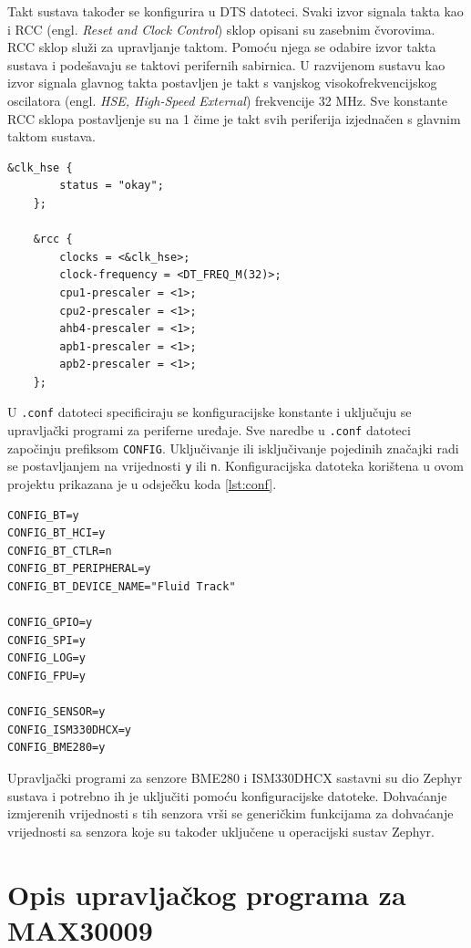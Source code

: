 \documentclass[../diplomski_rad.tex]{subfiles}
\begin{document}
Takt sustava također se konfigurira u DTS datoteci. Svaki izvor signala takta kao i 
RCC (engl. \textit{Reset and Clock Control}) sklop opisani su zasebnim čvorovima. 
RCC sklop služi za upravljanje taktom. Pomoću njega se odabire izvor takta sustava i podešavaju se 
taktovi perifernih sabirnica. 
U razvijenom sustavu kao izvor signala glavnog takta postavljen je takt s vanjskog visokofrekvencijskog 
oscilatora (engl. \textit{HSE, High-Speed External}) frekvencije 32 MHz. Sve konstante RCC sklopa postavljenje su na 1 
čime je takt svih periferija izjednačen s glavnim taktom sustava.   
\begin{lstlisting}[label={lst:takt},style=CStyle,caption={Konfiguracijska takta sustava},captionpos=b]
    &clk_hse {
        status = "okay";
    };

    &rcc {
        clocks = <&clk_hse>;
        clock-frequency = <DT_FREQ_M(32)>;
        cpu1-prescaler = <1>;
        cpu2-prescaler = <1>;
        ahb4-prescaler = <1>;
        apb1-prescaler = <1>;
        apb2-prescaler = <1>;
    };
\end{lstlisting} 

U \texttt{.conf} datoteci specificiraju se 
konfiguracijske konstante i uključuju se upravljački programi za periferne uređaje. 
Sve naredbe u \texttt{.conf} datoteci započinju prefiksom \texttt{CONFIG}. 
Uključivanje ili isključivanje pojedinih značajki radi se postavljanjem na vrijednosti \texttt{y} ili \texttt{n}.
Konfiguracijska datoteka korištena u ovom projektu prikazana je u odsječku koda \ref{lst:conf}.
\begin{lstlisting}[label={lst:conf},style=CStyle,caption={Konfiguracijska datoteka razvijenog sustava},captionpos=b]
CONFIG_BT=y
CONFIG_BT_HCI=y
CONFIG_BT_CTLR=n
CONFIG_BT_PERIPHERAL=y
CONFIG_BT_DEVICE_NAME="Fluid Track"

CONFIG_GPIO=y
CONFIG_SPI=y
CONFIG_LOG=y
CONFIG_FPU=y

CONFIG_SENSOR=y
CONFIG_ISM330DHCX=y
CONFIG_BME280=y
\end{lstlisting} 

Upravljački programi za senzore BME280 i ISM330DHCX sastavni su dio Zephyr sustava i potrebno ih je uključiti 
pomoću konfiguracijske datoteke. 
Dohvaćanje izmjerenih vrijednosti s tih senzora vrši se generičkim funkcijama za dohvaćanje vrijednosti sa senzora koje 
su također uključene u operacijski sustav Zephyr. 

\section{Opis upravljačkog programa za MAX30009}
\end{document}
